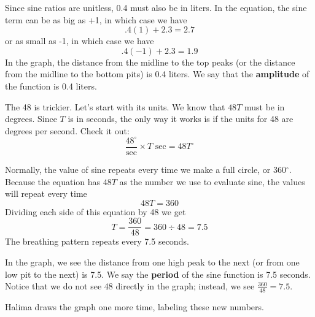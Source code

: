 Since sine ratios are unitless, 0.4 must also be in liters.  In the equation, the sine term can be as big as +1, in which case we have 
$$.4(1) + 2.3 = 2.7$$
or as small as -1, in which case we have
$$.4(-1) + 2.3 = 1.9$$
In the graph, the distance from the midline to the top peaks (or the distance from the midline to the bottom pits) is 0.4 liters. We say that the \textbf{amplitude} of the function is 0.4 liters.

The 48 is trickier.  Let's start with its units. We know that $48T$ must be in degrees.  Since $T$ is in seconds, the only way it works is if the units for 48 are degrees per second.  Check it out:
$$\frac{48^\circ}{\text{sec}}\times T\text{ sec} = 48T^\circ$$

Normally, the value of sine repeats every time we make a full circle, or 360$^\circ$.  Because the equation has $48T$ as the number we use to evaluate sine, the values will repeat every time $$48T=360$$
Dividing each side of this equation by 48 we get 
$$T = \frac{360}{48} = 360 \div 48 = 7.5$$
The breathing pattern repeats every 7.5 seconds. 

In the graph, we see the distance from one high peak to the next (or from one low pit to the next) is 7.5. We say the \textbf{period} of the sine function is 7.5 seconds. Notice that we do not see 48 directly in the graph; instead, we see $\frac{360}{48}=7.5$.

Halima draws the graph one more time, labeling these new numbers.

